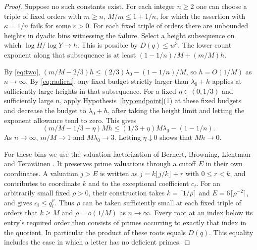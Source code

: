 \documentclass[11pt,reqno]{amsart}
\newcommand{\eps}{\varepsilon}
\begin{document}
\begin{proof}
Suppose no such constants exist. For each integer \(n\ge2\) one can
choose a triple of fixed orders with \(m\ge n\), \(M/m\le1+1/n\), for
which the assertion with \(\kappa=1/n\) fails for some \(\eps>0\).
For each fixed triple of orders there are unbounded heights in dyadic
bins witnessing the failure. Select a height subsequence on which
\(\log H/\log Y\to h\). This is possible by \(D(q)\le w^3\).
The lower count exponent along that subsequence is at least
\((1-1/n)/M+(m/M)h\).

By \eqref{eq:two},
\((m/M-2/3)h\le (2/3)\lambda_0-(1-1/n)/M\), so \(h=O(1/M)\) as
\(n\to\infty\). By \eqref{eq:radical}, any fixed budget strictly
larger than \(\lambda_0+h\) applies at sufficiently large heights in
that subsequence. For a fixed \(\eta\in(0,1/3)\) and sufficiently large
\(n\), apply Hypothesis~\ref{hyp:endpoint}(1) at these fixed budgets
and decrease the budget to \(\lambda_0+h\), after taking the height
limit and letting the exponent allowance tend to zero. This gives
\[
 (m/M-1/3-\eta)Mh\le(1/3+\eta)M\lambda_0-(1-1/n).
\]
As \(n\to\infty\), \(m/M\to1\) and \(M\lambda_0\to3\). Letting
\(\eta\downarrow0\) shows that \(Mh\to0\).

For these bins we use the valuation factorization of
Bernert, Browning, Lichtman and Ter\"av\"ainen \cite[Lemma~2.2]{BBLT}.
It preserves prime valuations through a cutoff \(E\) in their own
coordinates. A valuation \(j>E\) is written as
\(j=k\lfloor j/k\rfloor+r\) with \(0\le r<k\), and contributes to
coordinate \(k\) and to the exceptional coefficient \(c_i\). For an
arbitrarily small fixed \(\rho>0\), their construction takes
\(k=\lceil1/\rho\rceil\) and \(E=6\lceil\rho^{-2}\rceil\), and gives
\(c_i\le q_i^\rho\). Thus \(\rho\) can be taken sufficiently small at
each fixed triple of orders that \(k\ge M\) and \(\rho=o(1/M)\) as
\(n\to\infty\). Every root at an index below its entry's required order
then consists of primes occurring to exactly that index in the quotient.
In particular the product of these roots equals \(D(q)\). This equality
includes the case in which a letter has no deficient primes.


\end{proof}
\end{document}
